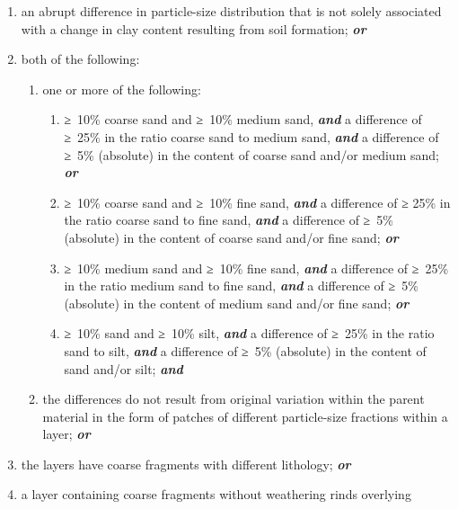 \documentclass[
  letterpaper,
  DIV=11,
  numbers=noendperiod]{scrreprt}
\providecommand{\tightlist}{%
  \setlength{\itemsep}{0pt}\setlength{\parskip}{0pt}}\usepackage{longtable,booktabs,array}
\begin{document}
\begin{enumerate}
\def\labelenumi{\arabic{enumi}.}
\tightlist
\item
  an abrupt difference in particle-size distribution that is not solely
  associated with a change in clay content resulting from soil
  formation; \textbf{\emph{or}}
\item
  both of the following:

  \begin{enumerate}
  \def\labelenumii{\alph{enumii}.}
  \tightlist
  \item
    one or more of the following:

    \begin{enumerate}
    \def\labelenumiii{\roman{enumiii}.}
    \tightlist
    \item
      ≥~10\% coarse sand and ≥~10\% medium sand, \textbf{\emph{and}} a
      difference of ≥~25\% in the ratio coarse sand to medium sand,
      \textbf{\emph{and}} a difference of ≥~5\% (absolute) in the
      content of coarse sand and/or medium sand; \textbf{\emph{or}}
    \item
      ≥~10\% coarse sand and ≥~10\% fine sand, \textbf{\emph{and}} a
      difference of ≥ 25\% in the ratio coarse sand to fine sand,
      \textbf{\emph{and}} a difference of ≥~5\% (absolute) in the
      content of coarse sand and/or fine sand; \textbf{\emph{or}}
    \item
      ≥~10\% medium sand and ≥~10\% fine sand, \textbf{\emph{and}} a
      difference of ≥~25\% in the ratio medium sand to fine sand,
      \textbf{\emph{and}} a difference of ≥~5\% (absolute) in the
      content of medium sand and/or fine sand; \textbf{\emph{or}}
    \item
      ≥~10\% sand and ≥~10\% silt, \textbf{\emph{and}} a difference of
      ≥~25\% in the ratio sand to silt, \textbf{\emph{and}} a difference
      of ≥~5\% (absolute) in the content of sand and/or silt;
      \textbf{\emph{and}}
    \end{enumerate}
  \item
    the differences do not result from original variation within the
    parent material in the form of patches of different particle-size
    fractions within a layer; \textbf{\emph{or}}
  \end{enumerate}
\item
  the layers have coarse fragments with different lithology;
  \textbf{\emph{or}}
\item
  a layer containing coarse fragments without weathering rinds overlying

\end{enumerate}
\end{document}

